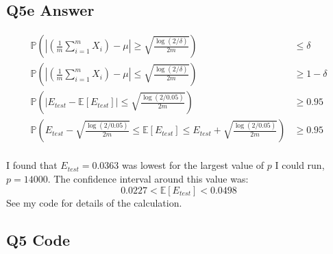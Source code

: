 \documentclass{article}
\newcommand{\1}{\mathbf{1}}
\renewcommand{\P}{\mathbb{P}} %
\def\E{\mathbb{E}}
\def\P{\mathbb{P}}
\begin{document}
\subsection{Q5e Answer}

\begin{align*}
\P\left( \left| \left(\frac{1}{m} \sum_{i=1}^m X_i\right) - \mu \right| \geq \sqrt{\frac{\log(2/\delta)}{2m}} \right) & \leq \delta \\
\P\left( \left| \left(\frac{1}{m} \sum_{i=1}^m X_i\right) - \mu \right| \leq \sqrt{\frac{\log(2/\delta)}{2m}} \right) & \geq 1 - \delta \\
\P\left( \left| E_{test} - \E[E_{test}] \right| \leq \sqrt{\frac{\log(2/0.05)}{2m}} \right) & \geq 0.95 \\
\P\left( E_{test} - \sqrt{\frac{\log(2/0.05)}{2m}} \leq  \E[E_{test}]  \leq E_{test} + \sqrt{\frac{\log(2/0.05)}{2m}} \right) & \geq 0.95 \\
\end{align*}

I found that $E_{test}=0.0363$  was lowest for the largest value of $p$ I could run, $p=14000$. 
The confidence interval around this value was:
$$ 0.0227 < \E[E_{test}] < 0.0498	$$
See my code for details of the calculation. 

\subsection{Q5 Code}

\end{document}
